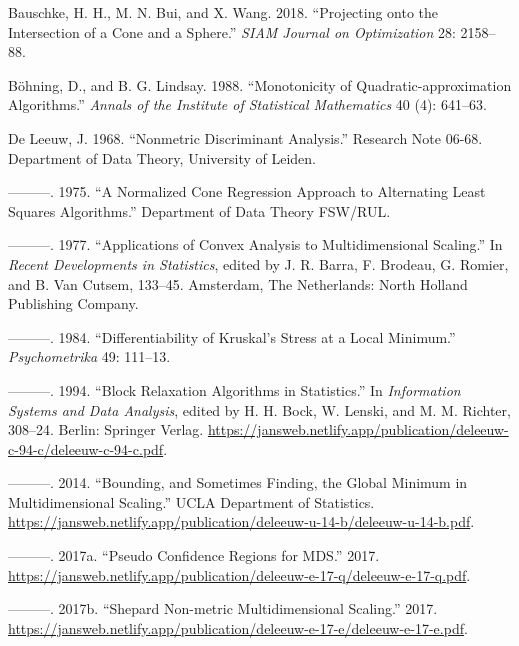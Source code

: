 \documentclass[
  12pt,
]{article}
\newlength{\cslhangindent}
\newenvironment{CSLReferences}[2] %
 {\begin{list}{}{%
  \setlength{\itemindent}{0pt}
  \setlength{\leftmargin}{0pt}
  \setlength{\parsep}{0pt}
  \ifodd #1
   \setlength{\leftmargin}{\cslhangindent}
   \setlength{\itemindent}{-1\cslhangindent}
  \fi
  \setlength{\itemsep}{#2\baselineskip}}}
 {\end{list}}
\begin{document}
\label{refs}
\begin{CSLReferences}{1}{0}
Bauschke, H. H., M. N. Bui, and X. Wang. 2018. {``{Projecting onto the Intersection of a Cone and a Sphere}.''} \emph{SIAM Journal on Optimization} 28: 2158--88.

Böhning, D., and B. G. Lindsay. 1988. {``{Monotonicity of Quadratic-approximation Algorithms}.''} \emph{Annals of the Institute of Statistical Mathematics} 40 (4): 641--63.

De Leeuw, J. 1968. {``Nonmetric Discriminant Analysis.''} Research Note 06-68. Department of Data Theory, University of Leiden.

---------. 1975. {``{A Normalized Cone Regression Approach to Alternating Least Squares Algorithms}.''} Department of Data Theory FSW/RUL.

---------. 1977. {``Applications of Convex Analysis to Multidimensional Scaling.''} In \emph{Recent Developments in Statistics}, edited by J. R. Barra, F. Brodeau, G. Romier, and B. Van Cutsem, 133--45. Amsterdam, The Netherlands: North Holland Publishing Company.

---------. 1984. {``{Differentiability of Kruskal's Stress at a Local Minimum}.''} \emph{Psychometrika} 49: 111--13.

---------. 1994. {``{Block Relaxation Algorithms in Statistics}.''} In \emph{Information Systems and Data Analysis}, edited by H. H. Bock, W. Lenski, and M. M. Richter, 308--24. Berlin: Springer Verlag. \url{https://jansweb.netlify.app/publication/deleeuw-c-94-c/deleeuw-c-94-c.pdf}.

---------. 2014. {``{Bounding, and Sometimes Finding, the Global Minimum in Multidimensional Scaling}.''} UCLA Department of Statistics. \url{https://jansweb.netlify.app/publication/deleeuw-u-14-b/deleeuw-u-14-b.pdf}.

---------. 2017a. {``{Pseudo Confidence Regions for MDS}.''} 2017. \url{https://jansweb.netlify.app/publication/deleeuw-e-17-q/deleeuw-e-17-q.pdf}.

---------. 2017b. {``{Shepard Non-metric Multidimensional Scaling}.''} 2017. \url{https://jansweb.netlify.app/publication/deleeuw-e-17-e/deleeuw-e-17-e.pdf}.


\end{CSLReferences}
\end{document}
